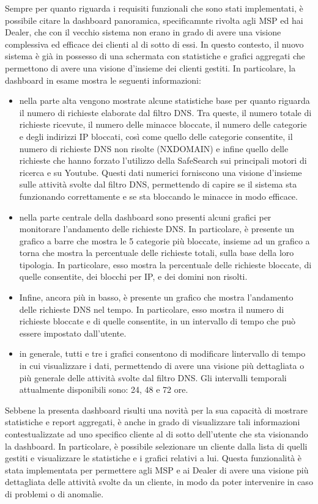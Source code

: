 Sempre per quanto riguarda i requisiti funzionali che sono stati implementati, è possibile citare la dashboard panoramica, specificamnte rivolta agli MSP ed hai Dealer, che con il vecchio sistema non erano in grado di avere una visione complessiva ed efficace dei clienti al di sotto di essi. In questo contesto, il nuovo sistema è già in possesso di una schermata con statistiche e grafici aggregati che permettono di avere una visione d'insieme dei clienti gestiti. In particolare, la dashboard in esame mostra le seguenti informazioni:
\begin{itemize}
  \item nella parte alta vengono mostrate alcune statistiche base per quanto riguarda il numero di richieste elaborate dal filtro DNS. Tra queste, il numero totale di richieste ricevute, il numero delle minacce bloccate, il numero delle categorie e degli indirizzi IP bloccati, così come quello delle categorie consentite, il numero di richieste DNS non risolte (NXDOMAIN) e infine quello delle richieste che hanno forzato l'utilizzo della SafeSearch sui principali motori di ricerca e su Youtube. Questi dati numerici forniscono una visione d'insieme sulle attività svolte dal filtro DNS, permettendo di capire se il sistema sta funzionando correttamente e se sta bloccando le minacce in modo efficace.
  \item nella parte centrale della dashboard sono presenti alcuni grafici per monitorare l'andamento delle richieste DNS. In particolare, è presente un grafico a barre che mostra le 5 categorie più bloccate, insieme ad un grafico a torna che mostra la percentuale delle richieste totali, sulla base della loro tipologia. In particolare, esso mostra la percentuale delle richieste bloccate, di quelle consentite, dei blocchi per IP, e dei domini non risolti.
  \item Infine, ancora più in basso, è presente un grafico che mostra l'andamento delle richieste DNS nel tempo. In particolare, esso mostra il numero di richieste bloccate e di quelle consentite, in un intervallo di tempo che può essere impostato dall'utente.
  \item in generale, tutti e tre i grafici consentono di modificare lintervallo di tempo in cui visualizzare i dati, permettendo di avere una visione più dettagliata o più generale delle attività svolte dal filtro DNS. Gli intervalli temporali attualmente disponibili sono: 24, 48 e 72 ore.
\end{itemize}

Sebbene la presenta dashboard risulti una novità per la sua capacità di mostrare statistiche e report aggregati, è anche in grado di visualizzare tali informazioni contestualizzate ad uno specifico cliente al di sotto dell'utente che sta visionando la dashboard. In particolare, è possibile selezionare un cliente dalla lista di quelli gestiti e visualizzare le statistiche e i grafici relativi a lui. Questa funzionalità è stata implementata per permettere agli MSP e ai Dealer di avere una visione più dettagliata delle attività svolte da un cliente, in modo da poter intervenire in caso di problemi o di anomalie.

